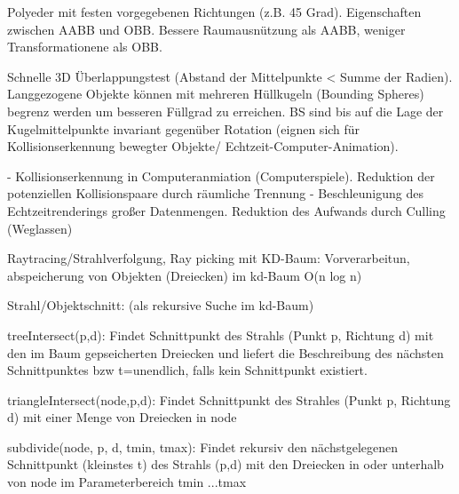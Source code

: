 \documentclass[10pt,landscape]{article}
\begin{document}
\begin{multicols}{3}
Polyeder mit festen vorgegebenen Richtungen (z.B. 45 Grad). Eigenschaften zwischen AABB und OBB. Bessere Raumausnützung als AABB, weniger Transformationene als OBB.

Schnelle 3D Überlappungstest (Abstand der Mittelpunkte < Summe der Radien). Langgezogene Objekte können mit mehreren Hüllkugeln (Bounding Spheres) begrenz werden um besseren Füllgrad zu erreichen. BS sind bis auf die Lage der Kugelmittelpunkte invariant gegenüber Rotation (eignen sich für Kollisionserkennung bewegter Objekte/ Echtzeit-Computer-Animation).

- Kollisionserkennung in Computeranmiation (Computerspiele). Reduktion der potenziellen Kollisionspaare durch räumliche Trennung
- Beschleunigung des Echtzeitrenderings großer Datenmengen. Reduktion des Aufwands durch Culling (Weglassen)

Raytracing/Strahlverfolgung, Ray picking mit KD-Baum: Vorverarbeitun, abspeicherung von Objekten (Dreiecken) im kd-Baum O(n log n)

Strahl/Objektschnitt: (als rekursive Suche im kd-Baum)

treeIntersect(p,d): Findet Schnittpunkt des Strahls (Punkt p, Richtung d) mit den im Baum gepseicherten Dreiecken und liefert die Beschreibung des nächsten Schnittpunktes bzw t=unendlich, falls kein Schnittpunkt existiert.

triangleIntersect(node,p,d): Findet Schnittpunkt des Strahles (Punkt p, Richtung d) mit einer Menge von Dreiecken in node

subdivide(node, p, d, tmin, tmax): Findet rekursiv den nächstgelegenen Schnittpunkt (kleinstes t) des Strahls (p,d) mit den Dreiecken in oder unterhalb von node im Parameterbereich tmin ...tmax


\end{multicols}
\end{document}

